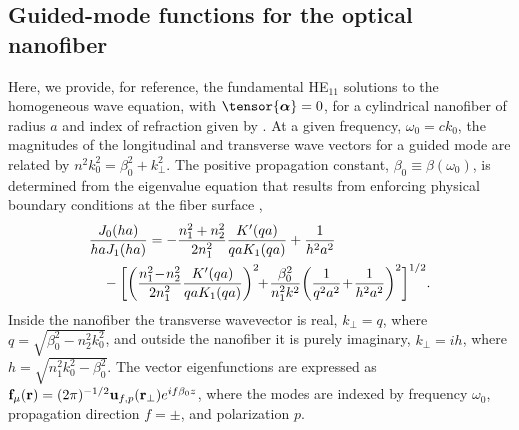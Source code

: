 \documentclass[aps,pra,twocolumn]{revtex4-1} %
\begin{document}
\begin{appendix}	


\section{Guided-mode functions for the optical nanofiber} \label{Appendix::ModeFunctions}


Here, we provide, for reference, the fundamental HE$_{11}$ solutions to the homogeneous wave equation,  with $\tensor{\boldsymbol{\alpha}} = 0$, for a cylindrical nanofiber of radius $a$ and index of refraction given by .  At a given frequency, $\omega_0 = c k_0$, the magnitudes of the longitudinal and transverse wave vectors for a guided mode are related by $n^2 k_0^2 = \beta_0^2 + k_\perp^2$.  
The positive propagation constant, $\beta_0 \equiv \beta(\omega_0)$, is determined from the eigenvalue equation that results from enforcing physical boundary conditions at the fiber surface \cite{Yariv, Marcuse, Snyder and Love},
	\begin{align}
		&\frac{J_0(ha)}{ha J_1(ha)} = - \frac{n_1^2+n_2^2}{2n_1^2} \frac{K'(qa)}{qa K_1(qa)} + \frac{1}{h^2 a^2} \nonumber\\
		&\quad- \bigg[ \bigg(\frac{n_1^2 \!-\! n_2^2}{2 n_1^2} \frac{K'(qa)}{qa K_1(qa)} \bigg)^2  \!\!+\! \frac{\beta_0^2}{n^2_1 k^2} \bigg(\frac{1}{q^2a^2} \!+\! \frac{1}{h^2a^2} \bigg)^2 \bigg]^{1/2}.
	\end{align}
Inside the nanofiber the transverse wavevector is real, $k_\perp = q$, where $q=\sqrt{\beta_0^2- n_2^2k_0^2}$, and outside the nanofiber it is purely imaginary, $k_\perp = i h$, where $h=\sqrt{n_1^2 k_0^2 - \beta_0^2}$.  The vector eigenfunctions are expressed as $\mathbf{f}_{\mu}(\mathbf{r}) = (2\pi)^{-1/2}\mathbf{u}_{f,p}(\mathbf{r}_\perp) e^{i f \beta_0 z}$, where the modes are indexed by frequency $\omega_0$, propagation direction $f = \pm$, and polarization $p$.


\end{appendix}
\end{document}
